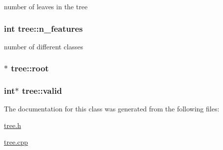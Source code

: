 number of leaves in the tree \hypertarget{classtree_a48430ab4447259c35af5f22e894e1d6c}{
\subsubsection[{n\+\_\+features}]{\setlength{\rightskip}{0pt plus 5cm}int tree\+::n\+\_\+features\hspace{0.3cm}{\ttfamily [protected]}}}\label{classtree_a48430ab4447259c35af5f22e894e1d6c}
number of different classes \hypertarget{classtree_ad397d4906e47149b98f769b3e81473ee}{
\subsubsection[{root}]{$\ast$ tree\+::root\hspace{0.3cm}{\ttfamily [protected]}}}\label{classtree_ad397d4906e47149b98f769b3e81473ee}
\hypertarget{classtree_afa8e539406e1f8b373b147682e3a8196}{
\subsubsection[{valid}]{\setlength{\rightskip}{0pt plus 5cm}int$\ast$ tree\+::valid}}\label{classtree_afa8e539406e1f8b373b147682e3a8196}


The documentation for this class was generated from the following files\+:\begin{DoxyCompactItemize}
\item 
\hyperlink{tree_8h}{tree.\+h}\item 
\hyperlink{tree_8cpp}{tree.\+cpp}\end{DoxyCompactItemize}
